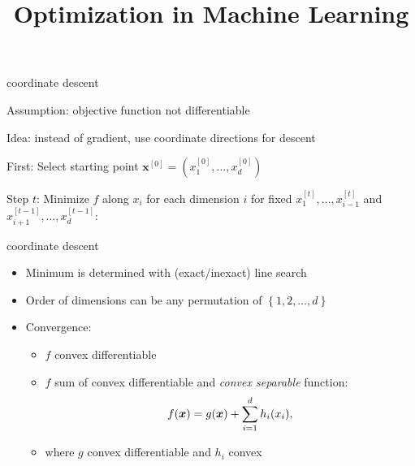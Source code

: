 \documentclass[11pt,compress,t,notes=noshow, xcolor=table]{beamer}
\title{Optimization in Machine Learning}
\begin{document}

\begin{framei}{coordinate descent}
\item Assumption: objective function not differentiable
\item Idea: instead of gradient, use coordinate directions for descent
\item First: Select starting point $\bm{x}^{[0]} = (x^{[0]}_1, \ldots, x^{[0]}_d)$
\item Step $t$: Minimize $f$ along $x_i$ for each dimension $i$ for fixed $x^{[t]}_1, \ldots,x^{[t]}_{i-1}$ and $x^{[t-1]}_{i+1}, \ldots,x^{[t-1]}_d$:
\end{framei}


\begin{framev}{coordinate descent}
\begin{itemize}
\item Minimum is determined with (exact/inexact) line search
\item Order of dimensions can be any permutation of $\left\{1,2,\ldots,d\right\}$
\item Convergence:
\begin{itemize}
\item $f$ convex differentiable
\item $f$ sum of convex differentiable and \textit{convex separable} function:
\begin{equation*}
f(\bm{x}) = g(\bm{x}) + \sum_{i=1}^d h_i(x_i),
\end{equation*}
\item where $g$ convex differentiable and $h_i$ convex
\end{itemize}
\end{itemize}
\end{framev}
\end{document}
